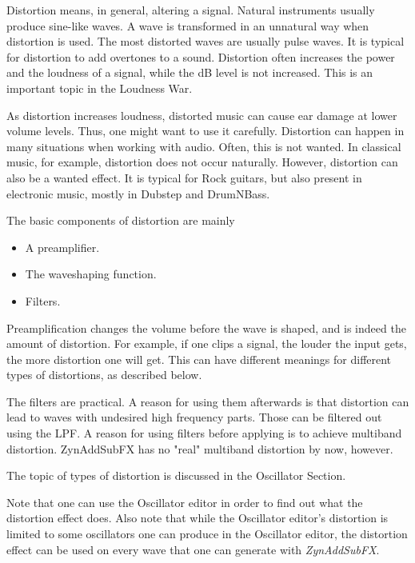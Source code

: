    Distortion means, in general, altering a signal. Natural instruments
   usually produce sine-like waves. A wave is transformed in an unnatural way
   when distortion is used. The most distorted waves are usually pulse waves.
   It is typical for distortion to add overtones to a sound. Distortion often
   increases the power and the loudness of a signal, while the dB level is
   not increased. This is an important topic in the Loudness War.

   As distortion increases loudness, distorted music can cause ear damage at
   lower volume levels. Thus, one might want to use it carefully.
   Distortion can happen in many situations when working with audio. Often,
   this is not wanted. In classical music, for example, distortion does not
   occur naturally. However, distortion can also be a wanted effect. It is
   typical for Rock guitars, but also present in electronic music, mostly in
   Dubstep and DrumNBass.

   The basic components of distortion are mainly

   \begin{itemize}
      \item A preamplifier.
      \item The waveshaping function.
      \item Filters.
   \end{itemize}

   Preamplification changes the volume before the wave is shaped, and is
   indeed the amount of distortion. For example, if one clips a signal, the
   louder the input gets, the more distortion one will get. This can have
   different meanings for different types of distortions, as described below.

   The filters are practical. A reason for using them afterwards is that
   distortion can lead to waves with undesired high frequency parts. Those
   can be filtered out using the LPF. A reason for using filters before
   applying is to achieve multiband distortion. ZynAddSubFX has no "real"
   multiband distortion by now, however.

   The topic of types of distortion is discussed in the
   Oscillator Section.

   Note that one can use the Oscillator editor in order
   to find out what the distortion effect does. Also note that while the
   Oscillator editor’s distortion is limited to some oscillators one can
   produce in the Oscillator editor, the distortion effect can be used on
   every wave that one can generate with \textsl{ZynAddSubFX}.


